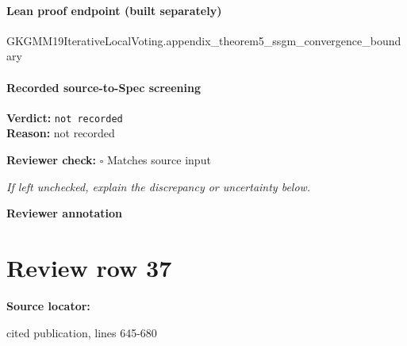 \documentclass[10pt]{article}
\newcommand{\reviewerbox}{%
  \par\noindent\fbox{\parbox{0.96\linewidth}{\rule{0pt}{0.38in}}}\par
}
\newcommand{\reviewmatch}[1]{%
  \par\noindent\textbf{Reviewer check:} $\square$\; #1\par
  \noindent\emph{If left unchecked, explain the discrepancy or uncertainty below.}\par
}
\begin{document}
\paragraph{Lean proof endpoint (built separately)}\begin{ReviewVerbatim}
GKGMM19IterativeLocalVoting.appendix_theorem5_ssgm_convergence_boundary
\end{ReviewVerbatim}

\paragraph{Recorded source-to-Spec screening}
\textbf{Verdict:} \texttt{not recorded}
\\
\textbf{Reason:} not recorded
\reviewmatch{Matches source input}
\noindent\textbf{Reviewer annotation}\par
\reviewerbox
\clearpage
\hypertarget{source-claim-6ed3807a13e71f2b}{}
\section*{Review row 37}
\textbf{Source locator:} {\footnotesize\raggedright cited publication, lines 645-\allowbreak{}680\par}
\end{document}
